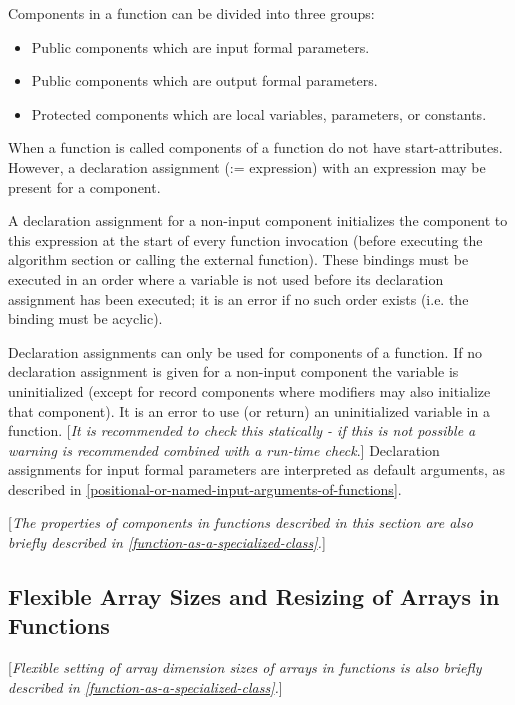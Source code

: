 \documentclass[10pt,a4paper]{report}
\def\doublelabel#1{\label{#1}\hypertarget{#1}{}}
\begin{document}
Components in a function can be divided into three groups:

\begin{itemize}
\item
  Public components which are input formal parameters.
\item
  Public components which are output formal parameters.
\item
  Protected components which are local variables, parameters, or
  constants.
\end{itemize}

When a function is called components of a function do not have
start-attributes. However, a declaration assignment (:= expression) with
an expression may be present for a component.

A declaration assignment for a non-input component initializes the
component to this expression at the start of every function invocation
(before executing the algorithm section or calling the external
function). These bindings must be executed in an order where a variable
is not used before its declaration assignment has been executed; it is
an error if no such order exists (i.e. the binding must be acyclic).

Declaration assignments can only be used for components of a function.
If no declaration assignment is given for a non-input component the
variable is uninitialized (except for record components where modifiers
may also initialize that component). It is an error to use (or return)
an uninitialized variable in a function. {[}\emph{It is recommended to
check this statically - if this is not possible a warning is recommended
combined with a run-time check}.{]} Declaration assignments for input
formal parameters are interpreted as default arguments, as described in
\ref{positional-or-named-input-arguments-of-functions}.

{[}\emph{The properties of components in functions described in this
section are also briefly described in \ref{function-as-a-specialized-class}.}{]}

\subsection{Flexible Array Sizes and Resizing of Arrays in Functions}\doublelabel{flexible-array-sizes-and-resizing-of-arrays-in-functions}

{[}\emph{Flexible setting of array dimension sizes of arrays in
functions is also briefly described in \ref{function-as-a-specialized-class}.}{]}
\end{document}
